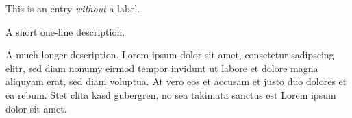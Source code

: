\begin{description}
   \item This is an entry \textit{without} a label.
   \item[Something short] A short one-line description.
   \item[Something long] A much longer description. Lorem ipsum dolor sit amet,
                         consetetur sadipscing elitr, sed diam nonumy eirmod
                         tempor invidunt ut labore et dolore magna aliquyam erat,
                         sed diam voluptua. At vero eos et accusam et justo duo
                         dolores et ea rebum. Stet clita kasd gubergren, no sea
                         takimata sanctus est Lorem ipsum dolor sit amet.
\end{description}